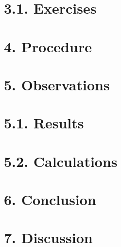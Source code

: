 \documentclass[12pt,a4paper]{article}
\begin{document}
\section*{3.1. Exercises}



\section*{4. Procedure}



\section*{5. Observations}



\section*{5.1. Results}



\section*{5.2. Calculations}



\section*{6. Conclusion}



\section*{7. Discussion}



\nocite{*}

\newpage
{\sloppy
	\printbibliography[title={\textcolor{blue}{References}}]
}
\end{document}
